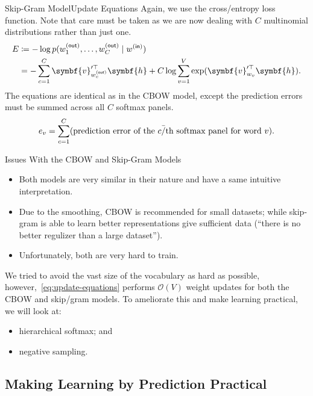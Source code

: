 \documentclass[usepdftitle=false]{beamer}
\theoremstyle{definition}
\renewcommand*{\vec}{\symbf}%
\newcommand*{\trans}{\top}%
\newcommand*{\BigOh}{\mathcal{O}}%
\newcommand*{\ins}{\mathsf{(in)}}
\newcommand*{\outs}{\mathsf{(out)}}
\begin{document}
\begin{frame}{Skip-Gram Model}{Update Equations}
  Again, we use the cross\-/entropy loss function.  Note that care
  must be taken as we are now dealing with \(C\) multinomial
  distributions rather than just one.
  \begin{align*}
    E &\coloneqq -\log p(w^{\outs}_1, \ldots, w^{\outs}_C \mid w^{\ins})\\
      &= -\sum_{c = 1}^{C} \vec{v}_{w^{\outs}_c}^{\prime\trans} \vec{h} +
        C \log \sum_{v = 1}^{V} \exp(\vec{v}_{w_v}^{\prime\trans} \vec{h})\text.
  \end{align*}
  The equations are identical as in the CBOW model, except the
  prediction errors must be summed across all \(C\) softmax panels.
  \[
    e_v = \sum_{c = 1}^{C}(\text{prediction error of the}\
    c\text{\=/th softmax panel for word }v)\text.
  \]
\end{frame}

\begin{frame}{Issues With the CBOW and Skip-Gram Models}
  \begin{itemize}
  \item Both models are very similar in their nature and have a same
    intuitive interpretation.
  \item Due to the smoothing, CBOW is recommended for small datasets;
    while skip-gram is able to learn better representations give
    sufficient data (\enquote{there is no better regulizer than a
      large dataset}).
  \item Unfortunately, both are very hard to train.
  \end{itemize}
  We tried to avoid the vast size of the vocabulary as hard as
  possible, however,~\eqref{eq:update-equations} performs
  \(\BigOh(V)\) weight updates for both the CBOW and skip\-/gram
  models.  To ameliorate this and make learning practical, we will
  look at:
  \begin{itemize}
  \item hierarchical softmax; and
  \item negative sampling.
  \end{itemize}
\end{frame}

\subsection{Making Learning by Prediction Practical}
\end{document}
